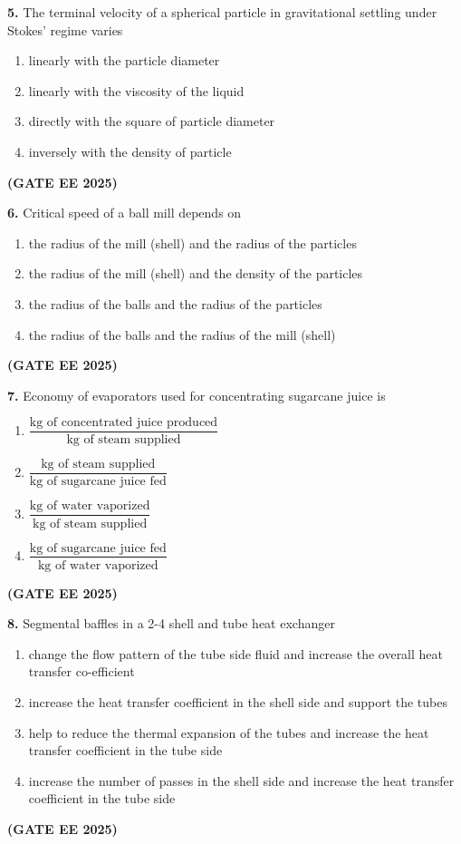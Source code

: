 \documentclass[journal,12pt,onecolumn]{IEEEtran}
\newcommand{\brak}[1]{(#1)}
\begin{document}
\noindent\textbf{5.} The terminal velocity of a spherical particle in gravitational settling under Stokes' regime varies
\begin{enumerate}
    \item linearly with the particle diameter
    \item linearly with the viscosity of the liquid
    \item directly with the square of particle diameter
    \item inversely with the density of particle
\end{enumerate}
\hfill \textbf{\brak{GATE EE 2025}}

\noindent\textbf{6.} Critical speed of a ball mill depends on
\begin{enumerate}
    \item the radius of the mill \brak{shell} and the radius of the particles
    \item the radius of the mill \brak{shell} and the density of the particles
    \item the radius of the balls and the radius of the particles
    \item the radius of the balls and the radius of the mill \brak{shell}
\end{enumerate}
\hfill \textbf{\brak{GATE EE 2025}}

\noindent\textbf{7.} Economy of evaporators used for concentrating sugarcane juice is
\begin{enumerate}
    \item $\dfrac{\text{kg of concentrated juice produced}}{\text{kg of steam supplied}}$
    \item $\dfrac{\text{kg of steam supplied}}{\text{kg of sugarcane juice fed}}$
    \item $\dfrac{\text{kg of water vaporized}}{\text{kg of steam supplied}}$
    \item $\dfrac{\text{kg of sugarcane juice fed}}{\text{kg of water vaporized}}$
\end{enumerate}
\hfill \textbf{\brak{GATE EE 2025}}

\noindent\textbf{8.} Segmental baffles in a 2-4 shell and tube heat exchanger
\begin{enumerate}
    \item change the flow pattern of the tube side fluid and increase the overall heat transfer co-efficient
    \item increase the heat transfer coefficient in the shell side and support the tubes
    \item help to reduce the thermal expansion of the tubes and increase the heat transfer coefficient in the tube side
    \item increase the number of passes in the shell side and increase the heat transfer coefficient in the tube side
\end{enumerate}
\hfill \textbf{\brak{GATE EE 2025}}
\end{document}
